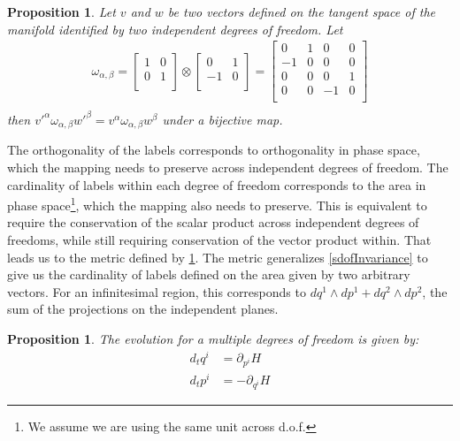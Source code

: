 \documentclass[twocolumn,floatfix,nofootinbib]{revtex4}   %
\theoremstyle{theorem}
\newtheorem{prop}[thm]{Proposition}
\theoremstyle{definition}
\begin{document}
\begin{prop}\label{mdofInvariance}
Let $v$ and $w$ be two vectors defined on the tangent space of the manifold identified by two independent degrees of freedom. Let
\begin{align*}
\omega_{\alpha, \beta} =  \left[
  \begin{array}{cc}
    1 & 0 \\
    0 & 1 \\
  \end{array}
\right] \otimes \left[
  \begin{array}{cc}
    0 & 1 \\
    -1 & 0 \\
  \end{array}
\right] =
\left[
  \begin{array}{cccc}
    0 & 1 & 0 & 0 \\
    -1 & 0 & 0 & 0 \\
    0 & 0 & 0 & 1 \\
    0 & 0 & -1 & 0 \\
  \end{array}
\right] \\
\end{align*}
then $v'^{\alpha} \omega_{\alpha, \beta} w'^{\beta}=v^{\alpha} \omega_{\alpha, \beta} w^{\beta}$ under a bijective map.
\end{prop}

The orthogonality of the labels corresponds to orthogonality in phase space, which the mapping needs to preserve across independent degrees of freedom. The cardinality of labels within each degree of freedom corresponds to the area in phase space\footnote{We assume we are using the same unit across d.o.f.}, which the mapping also needs to preserve. This is equivalent to require the conservation of the scalar product across independent degrees of freedoms, while still requiring conservation of the vector product within. That leads us to the metric defined by \ref{mdofInvariance}.
The metric generalizes \ref{sdofInvariance} to give us the cardinality of labels defined on the area given by two arbitrary vectors. For an infinitesimal region, this corresponds to $dq^1 \wedge dp^1 + dq^2 \wedge dp^2$, the sum of the projections on the independent planes.

\begin{prop}\label{mdofHam}
The evolution for a multiple degrees of freedom is given by:
\begin{align*}
d_{t}q^i &= \partial_{p^i} H \\
d_{t}p^i &= - \partial_{q^i} H
\end{align*}
\end{prop}
\end{document}
